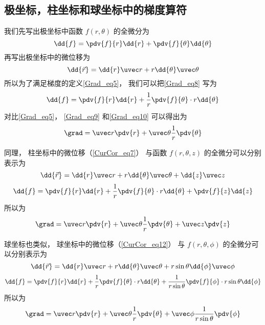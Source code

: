 \subsection{极坐标，柱坐标和球坐标中的梯度算符}

我们先写出极坐标中函数 $f(r,\theta)$ 的全微分为
\begin{equation}\label{Grad_eq8}
\dd{f} = \pdv{f}{r} \dd{r} + \pdv{f}{\theta} \dd{\theta}
\end{equation}
再写出极坐标中的微位移为
\begin{equation}\label{Grad_eq9}
\dd{\vec r} = \dd{r} \uvec r + r \dd{\theta} \uvec \theta
\end{equation}
所以为了满足梯度的定义\autoref{Grad_eq5}， 我们可以把\autoref{Grad_eq8} 写为
\begin{equation}\label{Grad_eq10}
\dd{f} = \pdv{f}{r} \dd{r} + \frac1r \pdv{f}{\theta} \cdot r\dd{\theta}
\end{equation}
对比\autoref{Grad_eq5}， \autoref{Grad_eq9} 和\autoref{Grad_eq10} 可以得出为
\begin{equation}
\grad = \uvec r \pdv{r} + \uvec \theta \frac1r \pdv{\theta}
\end{equation}

同理， 柱坐标中的微位移（\autoref{CurCor_eq7}） 与函数 $f(r,\theta, z)$ 的全微分可以分别表示为
\begin{equation}
\dd{\vec r} = \dd{r} \uvec r + r\dd{\theta} \uvec \theta + \dd{z} \uvec z
\end{equation}
\begin{equation}
\dd{f} = \pdv{f}{r} \dd{r} + \frac1r \pdv{f}{\theta} \cdot  r\dd{\theta} + \pdv{f}{z} \dd{z}
\end{equation}
所以为
\begin{equation}
\grad = \uvec r \pdv{r} + \uvec \theta \frac1r \pdv{\theta} + \uvec z \pdv{z}
\end{equation}

球坐标也类似， 球坐标中的微位移（\autoref{CurCor_eq12}） 与 $f(r,\theta,\phi)$ 的全微分可以分别表示为
\begin{equation}
\dd{\vec r} = \dd{r}\uvec r + r\dd{\theta} \uvec \theta + r\sin\theta\dd{\phi}\uvec \phi
\end{equation}
\begin{equation}
\dd{f} = \pdv{f}{r} \dd{r} + \frac1r \pdv{f}{\theta} \cdot r\dd{\theta} + \frac{1}{ r\sin\theta} \pdv{f}{\phi} \cdot r\sin\theta\dd{\phi}
\end{equation}
所以为
\begin{equation}
\grad = \uvec r \pdv{r} + \uvec \theta \frac1r \pdv{\theta} + \uvec \phi \frac{1}{ r\sin\theta} \pdv{\phi}
\end{equation}

